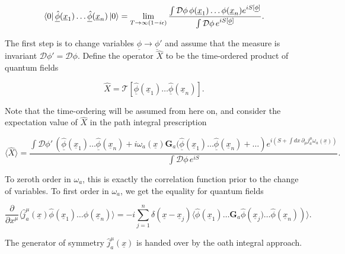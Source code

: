 \begin{equation}
\bra{0} \underline{\hat{\phi}} (\underline{x}_1) \dots \underline{\hat{\phi}} (\underline{x}_n) \ket{0} = \lim_{T \rightarrow \infty(1-i\epsilon)} \frac{\int \mathcal{D}\phi \, \phi (\underline{x}_1) \dots \phi (\underline{x}_n) e^{iS[\underline{\phi}]}}{\int \mathcal{D} \phi \, e^{i S[\underline{\phi}]}}.
\end{equation}

\noindent The first step is to change variables $\underline{\phi} \rightarrow \underline{\phi}'$ and assume that the measure is invariant $\mathcal{D}\phi' = \mathcal{D}\phi$. Define the operator $\hat{X}$ to be the time-ordered product of quantum fields

\begin{equation}
\hat{X} = \mathcal{T} [ \underline{\hat{\phi}} (\underline{x}_1) \dots \underline{\hat{\phi}} (\underline{x}_n)].
\end{equation}

\noindent Note that the time-ordering will be assumed from here on, and consider the expectation value of $\hat{X}$ in the path integral prescription

\begin{equation}
\langle \hat{X} \rangle = \frac{\int \mathcal{D} \phi' \, \left( \underline{\hat{\phi}} (\underline{x}_1) \dots \underline{\hat{\phi}} (\underline{x}_n) + i \omega_a (\underline{x}) \textbf{G}_a (\underline{\hat{\phi}} (\underline{x}_1) \dots \underline{\hat{\phi}} (\underline{x}_n) + \dots \right) e^{i (S + \int dx \, \partial_\mu j_a^\mu \omega_a (\underline{x}))}}{\int \mathcal{D}\phi \, e^{iS}}.
\end{equation}

\noindent To zeroth order in $\omega_a$, this is exactly the correlation function prior to the change of variables. To first order in $\omega_a$, we get the equality for quantum fields

\begin{equation}
\frac{\partial}{\partial x^\mu} \langle \hat{j}_a^\mu (\underline{x}) \hat{\phi} (\underline{x}_1) \dots \hat{\phi} (\underline{x}_n) \rangle = -i \sum_{j=1}^{n} \delta(\underline{x} - \underline{x}_j) \langle \hat{\phi} (\underline{x}_1) \dots \textbf{G}_a \hat{\phi} \left( \underline{x}_j) \dots \hat{\phi} (\underline{x}_n) \right)\rangle.
\end{equation}

\noindent The generator of symmetry $\hat{j}_a^\mu (\underline{x})$ is handed over by the oath integral approach.